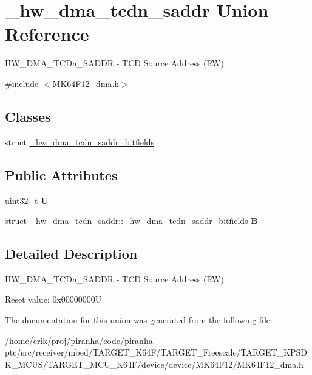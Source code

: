 \hypertarget{union__hw__dma__tcdn__saddr}{}\section{\+\_\+hw\+\_\+dma\+\_\+tcdn\+\_\+saddr Union Reference}
\label{union__hw__dma__tcdn__saddr}


H\+W\+\_\+\+D\+M\+A\+\_\+\+T\+C\+Dn\+\_\+\+S\+A\+D\+DR -\/ T\+CD Source Address (RW)  




{\ttfamily \#include $<$M\+K64\+F12\+\_\+dma.\+h$>$}

\subsection*{Classes}
\begin{DoxyCompactItemize}
\item 
struct \hyperlink{struct__hw__dma__tcdn__saddr_1_1__hw__dma__tcdn__saddr__bitfields}{\+\_\+hw\+\_\+dma\+\_\+tcdn\+\_\+saddr\+\_\+bitfields}
\end{DoxyCompactItemize}
\subsection*{Public Attributes}
\begin{DoxyCompactItemize}
\item 
uint32\+\_\+t {\bfseries U}\hypertarget{union__hw__dma__tcdn__saddr_a64b95b2d7482dde57b15e55392fb7c8e}{}\label{union__hw__dma__tcdn__saddr_a64b95b2d7482dde57b15e55392fb7c8e}

\item 
struct \hyperlink{struct__hw__dma__tcdn__saddr_1_1__hw__dma__tcdn__saddr__bitfields}{\+\_\+hw\+\_\+dma\+\_\+tcdn\+\_\+saddr\+::\+\_\+hw\+\_\+dma\+\_\+tcdn\+\_\+saddr\+\_\+bitfields} {\bfseries B}\hypertarget{union__hw__dma__tcdn__saddr_ab6c03a045526d14d8d3a6ea47230ae4a}{}\label{union__hw__dma__tcdn__saddr_ab6c03a045526d14d8d3a6ea47230ae4a}

\end{DoxyCompactItemize}


\subsection{Detailed Description}
H\+W\+\_\+\+D\+M\+A\+\_\+\+T\+C\+Dn\+\_\+\+S\+A\+D\+DR -\/ T\+CD Source Address (RW) 

Reset value\+: 0x00000000U 

The documentation for this union was generated from the following file\+:\begin{DoxyCompactItemize}
\item 
/home/erik/proj/piranha/code/piranha-\/ptc/src/receiver/mbed/\+T\+A\+R\+G\+E\+T\+\_\+\+K64\+F/\+T\+A\+R\+G\+E\+T\+\_\+\+Freescale/\+T\+A\+R\+G\+E\+T\+\_\+\+K\+P\+S\+D\+K\+\_\+\+M\+C\+U\+S/\+T\+A\+R\+G\+E\+T\+\_\+\+M\+C\+U\+\_\+\+K64\+F/device/device/\+M\+K64\+F12/M\+K64\+F12\+\_\+dma.\+h\end{DoxyCompactItemize}
